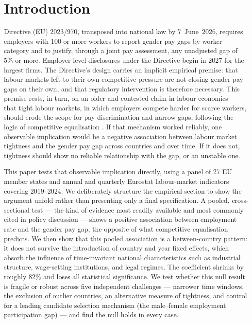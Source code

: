\documentclass[12pt,a4paper]{article}
\begin{document}
\newpage

\section{Introduction}
\label{sec:intro}

Directive (EU) 2023/970, transposed into national law by 7~June~2026, requires
employers with 100 or more workers to report gender pay gaps by worker category
and to justify, through a joint pay assessment, any unadjusted gap of 5\% or
more.  Employer-level disclosures under the Directive begin in 2027 for the
largest firms.  The Directive's design carries an implicit empirical premise:
that labour markets left to their own competitive pressure are not closing gender
pay gaps on their own, and that regulatory intervention is therefore necessary.
This premise rests, in turn, on an older and contested claim in labour economics
--- that tight labour markets, in which employers compete harder for scarce
workers, should erode the scope for pay discrimination and narrow gaps, following
the logic of competitive equalisation \citep{Becker1957}.  If that mechanism
worked reliably, one observable implication would be a negative association
between labour market tightness and the gender pay gap across countries and over
time.  If it does not, tightness should show no reliable relationship with the
gap, or an unstable one.

This paper tests that observable implication directly, using a panel of 27 EU
member states and annual and quarterly Eurostat labour-market indicators covering
2019--2024.  We deliberately structure the empirical section to show the
argument unfold rather than presenting only a final specification.  A pooled,
cross-sectional test --- the kind of evidence most readily available and most
commonly cited in policy discussion --- shows a positive association between
employment rate and the gender pay gap, the opposite of what competitive
equalisation predicts.  We then show that this pooled association is a
between-country pattern: it does not survive the introduction of country and year
fixed effects, which absorb the influence of time-invariant national
characteristics such as industrial structure, wage-setting institutions, and
legal regimes.  The coefficient shrinks by roughly 82\% and loses all
statistical significance.  We test whether this null result is fragile or robust
across five independent challenges --- narrower time windows, the exclusion of
outlier countries, an alternative measure of tightness, and control for a leading
candidate selection mechanism (the male--female employment participation gap) ---
and find the null holds in every case.
\end{document}
